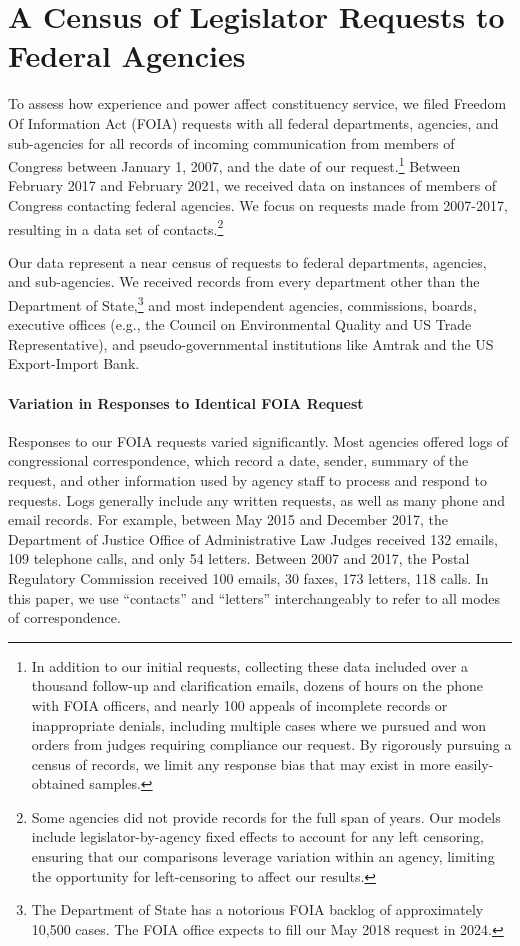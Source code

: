 \documentclass[12pt]{article}
\begin{document}
\section{A Census of Legislator Requests to Federal Agencies} \label{s:data}
To assess how experience and power affect constituency service, we filed   Freedom Of Information Act (FOIA) requests with all federal departments, agencies, and sub-agencies for all records of incoming communication from members of Congress between January 1, 2007, and the date of our request.\footnote{In addition to our initial requests, collecting these data included over a thousand follow-up and clarification emails, dozens of hours on the phone with FOIA officers, and nearly 100 appeals of incomplete records or inappropriate denials, including multiple cases where we pursued and won orders from judges requiring compliance our request. By rigorously pursuing a census of records, we limit any response bias that may exist in more easily-obtained samples.} Between February 2017 and February 2021, we received data on  instances of members of Congress contacting federal agencies. We focus on requests made from 2007-2017, resulting in a data set of   contacts.\footnote{Some agencies did not provide records for the full span of years. Our models include legislator-by-agency fixed effects to account for any left censoring, ensuring that our comparisons leverage variation within an agency, limiting the opportunity for left-censoring to affect our results.}  %

Our data represent a near census of requests to federal departments, agencies, and sub-agencies. We received records from every department other than the Department of State,\footnote{The Department of State has a notorious FOIA backlog of approximately 10,500 cases. The FOIA office expects to fill our May 2018 request in 2024.} and most independent agencies, commissions, boards, executive offices (e.g., the Council on Environmental Quality and US Trade Representative), and pseudo-governmental institutions like Amtrak and the US Export-Import Bank. 

\paragraph{Variation in Responses to Identical FOIA Request} Responses to our FOIA requests varied significantly. Most agencies offered logs of congressional correspondence, which record a date, sender, summary of the request, and other information used by agency staff to process and respond to requests. Logs generally include any written requests, as well as many phone and email records. For example, between May 2015 and December 2017, the Department of Justice Office of Administrative Law Judges received 132 emails, 109 telephone calls, and only 54 letters. Between 2007 and 2017, the Postal Regulatory Commission received 100 emails, 30 faxes, 173 letters, 118 calls. In this paper, we use ``contacts'' and ``letters'' interchangeably to refer to all modes of correspondence. 
\end{document}
